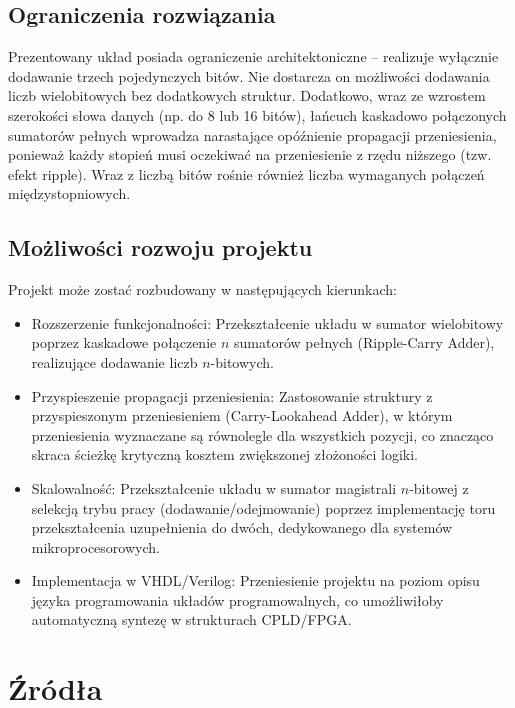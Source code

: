 \documentclass[12pt,a4paper]{article}
\begin{document}
\subsection{Ograniczenia rozwiązania}

Prezentowany układ posiada ograniczenie architektoniczne -- realizuje wyłącznie dodawanie trzech pojedynczych bitów. Nie dostarcza on możliwości dodawania liczb wielobitowych bez dodatkowych struktur. Dodatkowo, wraz ze wzrostem szerokości słowa danych (np. do 8 lub 16 bitów), łańcuch kaskadowo połączonych sumatorów pełnych wprowadza narastające opóźnienie propagacji przeniesienia, ponieważ każdy stopień musi oczekiwać na przeniesienie z rzędu niższego (tzw. efekt ripple). Wraz z liczbą bitów rośnie również liczba wymaganych połączeń międzystopniowych.

\subsection{Możliwości rozwoju projektu}

Projekt może zostać rozbudowany w następujących kierunkach:

\begin{itemize}
    \item Rozszerzenie funkcjonalności: Przekształcenie układu w sumator wielobitowy poprzez kaskadowe połączenie $n$ sumatorów pełnych (Ripple-Carry Adder), realizujące dodawanie liczb $n$-bitowych.
    \item Przyspieszenie propagacji przeniesienia: Zastosowanie struktury z przyspieszonym przeniesieniem (Carry-Lookahead Adder), w którym przeniesienia wyznaczane są równolegle dla wszystkich pozycji, co znacząco skraca ścieżkę krytyczną kosztem zwiększonej złożoności logiki.
    \item Skalowalność: Przekształcenie układu w sumator magistrali $n$-bitowej z selekcją trybu pracy (dodawanie/odejmowanie) poprzez implementację toru przekształcenia uzupełnienia do dwóch, dedykowanego dla systemów mikroprocesorowych.
    \item Implementacja w VHDL/Verilog: Przeniesienie projektu na poziom opisu języka programowania układów programowalnych, co umożliwiłoby automatyczną syntezę w strukturach CPLD/FPGA.
\end{itemize}


\section{Źródła}
\end{document}
